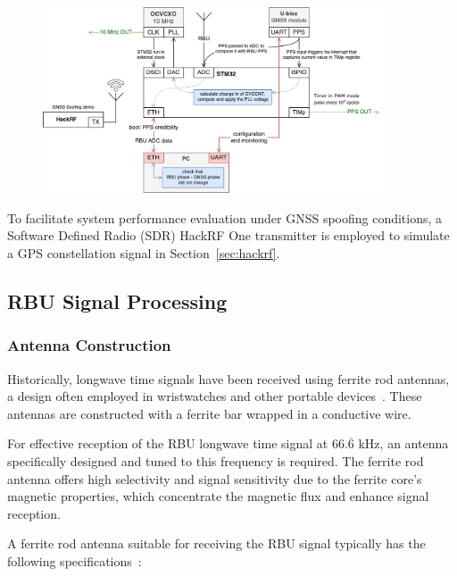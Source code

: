\documentclass[12pt, a4paper]{extarticle}
\begin{document}
\begin{figure}[t]
    \centering
    \includegraphics[width=0.9\textwidth]{device}
    \captionsetup{width=0.8\textwidth}
    \label{fig:device}
\end{figure}

To facilitate system performance evaluation under GNSS spoofing conditions, a
Software Defined Radio (SDR) HackRF One transmitter is employed to simulate a GPS
constellation signal in Section~\ref{sec:hackrf}.

\subsection{RBU Signal Processing}

\subsubsection{Antenna Construction}

Historically, longwave time signals have been received using ferrite rod
antennas, a design often employed in wristwatches and other portable
devices~\cite{time-measurement}. These antennas are constructed with a ferrite
bar wrapped in a conductive wire.

For effective reception of the RBU longwave time signal at $66.\overline{6}$
kHz, an antenna specifically designed and tuned to this frequency is required.
The ferrite rod antenna offers high selectivity and signal sensitivity due to
the ferrite core's magnetic properties, which concentrate the magnetic flux and
enhance signal reception.

A ferrite rod antenna suitable for receiving the RBU signal typically has the
following specifications~\cite{antennas}:
\end{document}
